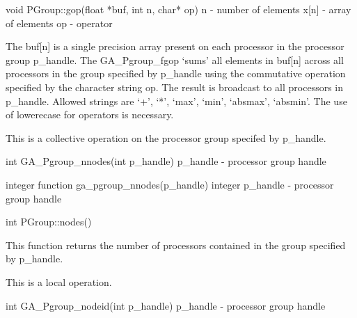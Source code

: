 \documentclass[12pt]{article}
\begin{document}
\begin{cxxapi}
void PGroup::gop(float *buf, int n, char* op)
   n              - number of elements                                     \access{[input]}
   x[n]           - array of elements                                      
   op             - operator                                               \access{[input]}
\end{cxxapi}

\begin{desc}

The buf[n] is a single precision array present on each processor in the processor group p_handle. The GA_Pgroup_fgop `sums' all elements in buf[n] across all processors in the group specified by p_handle using the commutative operation specified by the character string op.  The result is broadcast to all processors in p_handle. Allowed strings are `+', `*', `max', `min', `absmax', `absmin'. The use of lowerecase for operators is necessary.

This is a collective operation on the processor group specifed by p_handle. 
\end{desc}


\begin{capi}
int GA_Pgroup_nnodes(int p_handle)
   p_handle                      - processor group handle                  \access{[input]} 
\end{capi}

\begin{fapi}
integer function ga_pgroup_nnodes(p_handle)
   integer p_handle              - processor group handle                  \access{[input]} 
\end{fapi}

\begin{cxxapi}
int PGroup::nodes()
\end{cxxapi}

\begin{desc}

This function returns the number of processors contained in the group specified by p_handle.

This is a local operation.
\end{desc}


\begin{capi}
int GA_Pgroup_nodeid(int p_handle)
   p_handle                      - processor group handle                   \access{[input]} 
\end{capi}
\end{document}
